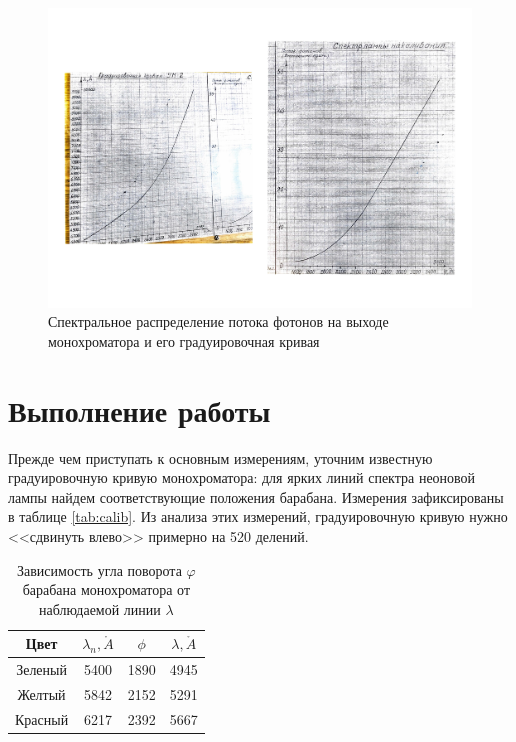 \documentclass[12pt]{kiarticle} %
\newcommand{\an}{\ensuremath{\mathring{A}}}
\begin{document}
	\begin{figure}[h]
		\centering	
		\includegraphics[width=\textwidth]{scan}
		\caption{Спектральное распределение потока фотонов на выходе монохроматора и его градуировочная кривая}
		\label{pic:calib}
	\end{figure}
	
	
	\section{Выполнение работы}
	
	Прежде чем приступать к основным измерениям, уточним известную градуировочную кривую монохроматора: для ярких линий спектра неоновой лампы найдем соответствующие положения барабана. Измерения зафиксированы в таблице \ref{tab:calib}. Из анализа этих измерений, градуировочную кривую нужно <<сдвинуть влево>> примерно на 520 делений.
	
	\begin{table}[h]
		\centering
		\caption{Зависимость угла поворота $\varphi$ барабана монохроматора от наблюдаемой линии $\lambda$}
		\begin{tabular}{|c|c|c|c|}
			\hline 
			Цвет & $ \lambda_n, \an $  & $ \phi $ & $ \lambda, \mathring{A} $ \\ 
			\hline 
			Зеленый& 5400 &  1890 & 4945 \\ 
			\hline 
			Желтый & 5842 & 2152 & 5291 \\ 
			\hline 
			Красный & 6217 & 2392 & 5667  \\ 
			\hline 
		\end{tabular} 
	\end{table}
	
\end{document}
